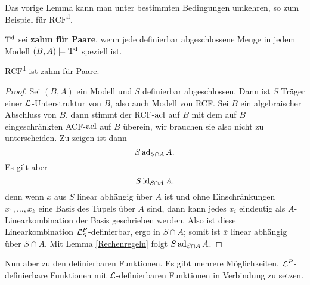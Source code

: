 Das vorige Lemma kann man unter bestimmten Bedingungen umkehren, so zum Beispiel für $\operatorname{RCF^d}$.
\begin{definition}
	$\operatorname{T^d}$ sei \textbf{zahm für Paare}, wenn jede definierbar abgeschlossene Menge in jedem Modell $(B,A)\models\operatorname{T^d}$ speziell ist.
\end{definition}

\begin{lemma}\label{RCF zahm}
	$\operatorname{RCF^d}$ ist zahm für Paare.
\end{lemma}
\begin{proof}
	Sei $(B,A)$ ein Modell und $S$ definierbar abgeschlossen. Dann ist $S$ Träger einer $\mathcal{L}$-Unterstruktur von $B$, also auch Modell von RCF. Sei $\overline{B}$ ein algebraischer Abschluss von $B$, dann stimmt der RCF-$\operatorname{acl}$ auf $B$ mit dem auf $B$ eingeschränkten ACF-$\operatorname{acl}$ auf $\overline{B}$ überein, wir brauchen sie also nicht zu unterscheiden. Zu zeigen ist dann $$S\operatorname{ad}_{S\cap A}A.$$
	Es gilt aber $$S\operatorname{ld}_{S\cap A}A,$$ denn wenn $\overline{x}$ aus $S$ linear abhängig über $A$ ist und ohne Einschränkungen $x_1,\dots,x_k$ eine Basis des Tupels über $A$ sind, dann kann jedes $x_i$ eindeutig als $A$-Linearkombination der Basis geschrieben werden. Also ist diese Linearkombination $\mathcal{L}^P_S$-definierbar, ergo in $S\cap A$; somit ist $\overline{x}$ linear abhängig über $S\cap A$. Mit Lemma \ref{Rechenregeln} folgt $S\operatorname{ad}_{S\cap A}A$.
\end{proof}

Nun aber zu den definierbaren Funktionen. Es gibt mehrere Möglichkeiten, $\mathcal{L}^P$-definierbare Funktionen mit $\mathcal{L}$-definierbaren Funktionen in Verbindung zu setzen.

